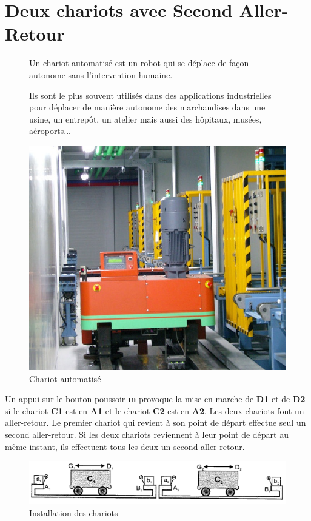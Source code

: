 

\section{Deux chariots avec Second Aller-Retour}

\begin{figure}[!h]
\begin{minipage}{0.55\linewidth}
Un chariot automatisé est un robot qui se déplace de façon autonome sans l'intervention humaine.

Ils sont le plus souvent utilisés dans des applications industrielles pour déplacer de manière autonome des marchandises dans une usine, un entrepôt, un atelier mais aussi des hôpitaux, musées, aéroports...
\end{minipage}
\hfill
\begin{minipage}{0.4\linewidth}
 \begin{center}
 \includegraphics[width=0.6\linewidth]{img/chariot.jpg}
 \end{center}
 \caption{Chariot automatisé}
 \label{img1}
 \end{minipage}
\end{figure}

Un appui sur le bouton-poussoir \textbf{m} provoque la mise en marche de \textbf{D1} et de \textbf{D2} si le chariot \textbf{C1} est en \textbf{A1} et le chariot \textbf{C2} est en \textbf{A2}. Les deux chariots font un aller-retour. Le premier chariot qui revient à son point de départ effectue seul un second aller-retour. Si les deux chariots reviennent à leur point de départ au même instant, ils effectuent tous les deux un second aller-retour.

\begin{figure}[!h]
 \begin{center}
 \includegraphics[width=0.8\linewidth]{img/Chariots_schema.png}
 \caption{Installation des chariots}
 \label{img2}
 \end{center}
\end{figure}

